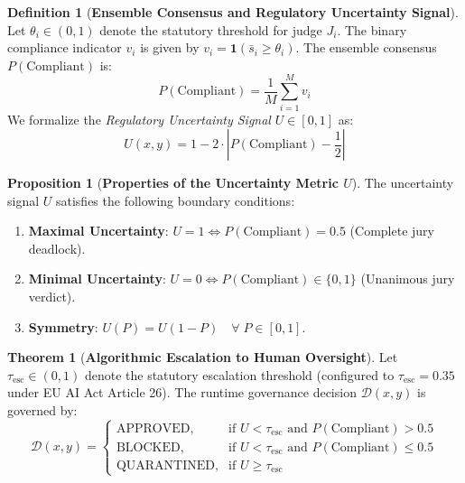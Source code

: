 \documentclass[11pt,a4paper]{article}
\theoremstyle{definition}
\newtheorem{definition}{Definition}
\newtheorem{theorem}{Theorem}
\newtheorem{proposition}{Proposition}
\begin{document}
\begin{definition}[\textbf{Ensemble Consensus and Regulatory Uncertainty Signal}]
Let $\theta_i \in (0, 1)$ denote the statutory threshold for judge $J_i$. The binary compliance indicator $v_i$ is given by $v_i = \mathbf{1}(\bar{s}_i \ge \theta_i)$. The ensemble consensus $P(\text{Compliant})$ is:
\begin{equation}
    P(\text{Compliant}) = \frac{1}{M} \sum_{i=1}^M v_i
\end{equation}
We formalize the \textit{Regulatory Uncertainty Signal} $U \in [0, 1]$ as:
\begin{equation}
    \label{eq:uncertainty}
    U(x, y) = 1 - 2 \cdot \left| P(\text{Compliant}) - \frac{1}{2} \right|
\end{equation}
\end{definition}

\begin{proposition}[\textbf{Properties of the Uncertainty Metric $U$}]
The uncertainty signal $U$ satisfies the following boundary conditions:
\begin{enumerate}
    \item \textbf{Maximal Uncertainty}: $U = 1 \iff P(\text{Compliant}) = 0.5$ (Complete jury deadlock).
    \item \textbf{Minimal Uncertainty}: $U = 0 \iff P(\text{Compliant}) \in \{0, 1\}$ (Unanimous jury verdict).
    \item \textbf{Symmetry}: $U(P) = U(1 - P) \quad \forall \; P \in [0, 1]$.
\end{enumerate}
\end{proposition}

\begin{theorem}[\textbf{Algorithmic Escalation to Human Oversight}]
Let $\tau_{\text{esc}} \in (0, 1)$ denote the statutory escalation threshold (configured to $\tau_{\text{esc}} = 0.35$ under EU AI Act Article 26). The runtime governance decision $\mathcal{D}(x, y)$ is governed by:
\begin{equation}
    \mathcal{D}(x, y) = 
    \begin{cases}
        \text{APPROVED}, & \text{if } U < \tau_{\text{esc}} \text{ and } P(\text{Compliant}) > 0.5 \\
        \text{BLOCKED}, & \text{if } U < \tau_{\text{esc}} \text{ and } P(\text{Compliant}) \le 0.5 \\
        \text{QUARANTINED}, & \text{if } U \ge \tau_{\text{esc}}
    \end{cases}
\end{equation}
\end{theorem}
\end{document}
